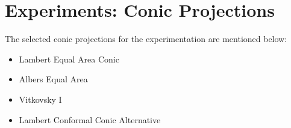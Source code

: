 \newpage
\section{Experiments: Conic Projections}
The selected conic projections for the experimentation are mentioned below:
\begin{itemize}
    \item Lambert Equal Area Conic
    \item Albers Equal Area
    \item Vitkovsky I
    \item Lambert Conformal Conic Alternative
\end{itemize}


